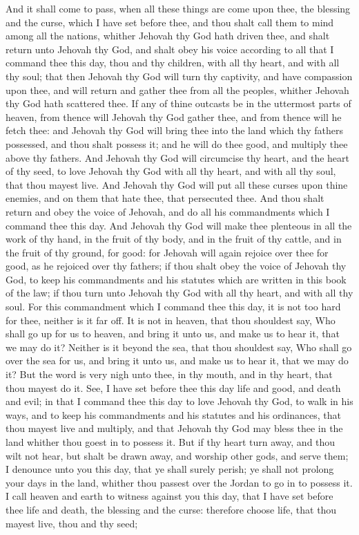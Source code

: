 And it shall come to pass, when all these things are come upon thee, the blessing and the curse, which I have set before thee, and thou shalt call them to mind among all the nations, whither Jehovah thy God hath driven thee, and shalt return unto Jehovah thy God, and shalt obey his voice according to all that I command thee this day, thou and thy children, with all thy heart, and with all thy soul; that then Jehovah thy God will turn thy captivity, and have compassion upon thee, and will return and gather thee from all the peoples, whither Jehovah thy God hath scattered thee. If any of thine outcasts be in the uttermost parts of heaven, from thence will Jehovah thy God gather thee, and from thence will he fetch thee: and Jehovah thy God will bring thee into the land which thy fathers possessed, and thou shalt possess it; and he will do thee good, and multiply thee above thy fathers. And Jehovah thy God will circumcise thy heart, and the heart of thy seed, to love Jehovah thy God with all thy heart, and with all thy soul, that thou mayest live. And Jehovah thy God will put all these curses upon thine enemies, and on them that hate thee, that persecuted thee. And thou shalt return and obey the voice of Jehovah, and do all his commandments which I command thee this day. And Jehovah thy God will make thee plenteous in all the work of thy hand, in the fruit of thy body, and in the fruit of thy cattle, and in the fruit of thy ground, for good: for Jehovah will again rejoice over thee for good, as he rejoiced over thy fathers; if thou shalt obey the voice of Jehovah thy God, to keep his commandments and his statutes which are written in this book of the law; if thou turn unto Jehovah thy God with all thy heart, and with all thy soul.  For this commandment which I command thee this day, it is not too hard for thee, neither is it far off. It is not in heaven, that thou shouldest say, Who shall go up for us to heaven, and bring it unto us, and make us to hear it, that we may do it? Neither is it beyond the sea, that thou shouldest say, Who shall go over the sea for us, and bring it unto us, and make us to hear it, that we may do it? But the word is very nigh unto thee, in thy mouth, and in thy heart, that thou mayest do it.  See, I have set before thee this day life and good, and death and evil; in that I command thee this day to love Jehovah thy God, to walk in his ways, and to keep his commandments and his statutes and his ordinances, that thou mayest live and multiply, and that Jehovah thy God may bless thee in the land whither thou goest in to possess it. But if thy heart turn away, and thou wilt not hear, but shalt be drawn away, and worship other gods, and serve them; I denounce unto you this day, that ye shall surely perish; ye shall not prolong your days in the land, whither thou passest over the Jordan to go in to possess it. I call heaven and earth to witness against you this day, that I have set before thee life and death, the blessing and the curse: therefore choose life, that thou mayest live, thou and thy seed; 